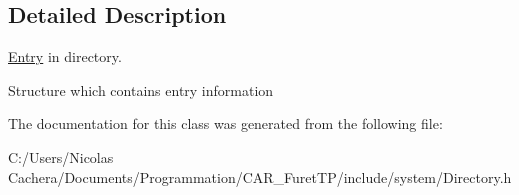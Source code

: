 \subsection{Detailed Description}
\hyperlink{structFTP_1_1Directory_1_1Entry}{Entry} in directory. 

Structure which contains entry information 

The documentation for this class was generated from the following file\+:\begin{DoxyCompactItemize}
\item 
C\+:/\+Users/\+Nicolas Cachera/\+Documents/\+Programmation/\+C\+A\+R\+\_\+\+Furet\+T\+P/include/system/Directory.\+h\end{DoxyCompactItemize}
